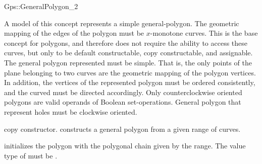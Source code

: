 \ccRefPageBegin

\begin{ccRefConcept}{Gps::GeneralPolygon_2}

\ccTypes


\ccGlue
{}
 
\ccDefinition
A model of this concept represents a simple general-polygon. The
geometric mapping of the edges of the polygon must be $x$-monotone curves.
This is the base concept for polygons, and therefore does not require the ability
to access these curves, but only to be default constructable, copy constructable, 
and assignable. 
The general polygon represented must be simple. That is, the
only points of the plane belonging to two curves are the geometric mapping
of the polygon vertices. In addition, the vertices of the represented 
polygon must be ordered consistently, and the curved must be directed 
accordingly. Only counterclockwise oriented polygons are valid operands
of Boolean set-operations. General polygon that represent holes must be
clockwise oriented.

\ccCreation
{}

\ccThreeToTwo

\ccGlue
{}
{copy constructor.}
\ccGlue
{}
\ccGlue
{}
{constructs a general polygon from a given range of curves.}

\ccAccessFunctions

\ccModifiers

{initializes the polygon with the polygonal chain given by the range. 
The value type of  must be .
}
 
% 

\ccHasModels

\end{ccRefConcept}

\ccRefPageEnd
